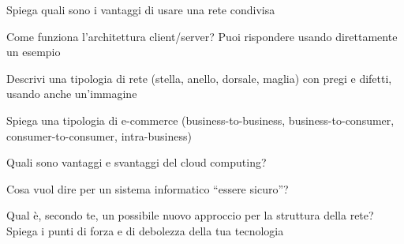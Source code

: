 \documentclass[addpoints]{exam}
\begin{document}
 
\begin{center}
\end{center}
 
\vspace{5mm}
 
 
\vspace{5mm}
 
 
\begin{questions}
	
\question[2] Spiega quali sono i vantaggi di usare una rete condivisa
\fillwithlines{1in}

\question[2] Come funziona l’architettura client/server? Puoi rispondere usando direttamente un esempio
\fillwithlines{2in}
 
\question[2] Descrivi una tipologia di rete (stella, anello, dorsale, maglia) con pregi e difetti, usando anche un’immagine
\fillwithlines{1in}

\question[2] Spiega una tipologia di e-commerce (business-to-business, business-to-consumer, consumer-to-consumer, intra-business)
\fillwithlines{2in}

\question[2] Quali sono vantaggi e svantaggi del cloud computing?
\fillwithlines{1in}

\question[2] Cosa vuol dire per un sistema informatico “essere sicuro”?
\fillwithlines{2in}

\question[2] Qual è, secondo te, un possibile nuovo approccio per la struttura della rete? Spiega i punti di forza e di debolezza della tua tecnologia
\fillwithlines{2in}
\end{questions}

\begin{center}
	\combinedgradetable[h][questions]
\end{center}
\end{document}
